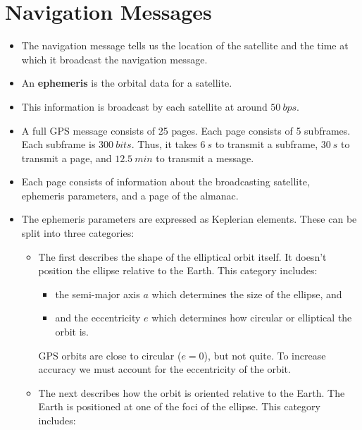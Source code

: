 \documentclass{article}
\begin{document}
\section{Navigation Messages}

\begin{itemize}
  \item The navigation message tells us the location of the satellite and the time at which it broadcast the navigation message.

  \item An \textbf{ephemeris} is the orbital data for a satellite.

  \item This information is broadcast by each satellite at around $\qty{50}{bps}$.

  \item A full GPS message consists of 25 pages. Each page consists of 5 subframes. Each subframe is $\qty{300}{bits}$. Thus, it takes $\qty{6}{s}$ to transmit a subframe, $\qty{30}{s}$ to transmit a page, and $\qty{12.5}{min}$ to transmit a message.

  \item Each page consists of information about the broadcasting satellite, \\ ephemeris parameters, and a page of the almanac.

  \item The ephemeris parameters are expressed as Keplerian elements. These can be split into three categories:

        \begin{itemize}
          \item The first describes the shape of the elliptical orbit itself. It doesn't position the ellipse relative to the Earth. This category includes:

                \begin{itemize}
                  \item the semi-major axis $a$ which determines the size of the ellipse, and

                  \item and the eccentricity $e$ which determines how circular or elliptical the orbit is.
                \end{itemize}

                GPS orbits are close to circular ($e = 0$), but not quite. To increase accuracy we must account for the eccentricity of the orbit.

          \item The next describes how the orbit is oriented relative to the Earth. The Earth is positioned at one of the foci of the ellipse. This category includes:


\end{itemize}
\end{itemize}
\end{document}
